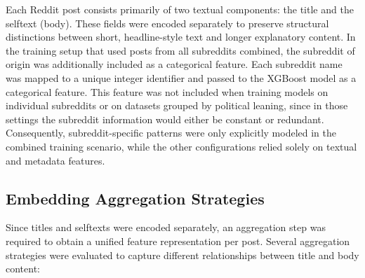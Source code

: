 Each Reddit post consists primarily of two textual components: the title and the selftext (body). 
These fields were encoded separately to preserve structural distinctions between short, headline-style text and longer explanatory content. 
In the training setup that used posts from all subreddits combined, the subreddit of origin was additionally included as a categorical feature. 
Each subreddit name was mapped to a unique integer identifier and passed to the XGBoost model as a categorical feature. This feature was not included when training models on individual subreddits or on datasets grouped by political leaning, since in those settings the subreddit information would either be constant or redundant. 
Consequently, subreddit-specific patterns were only explicitly modeled in the combined training scenario, while the other configurations relied solely on textual and metadata features.

\subsection{Embedding Aggregation Strategies}

Since titles and selftexts were encoded separately, an aggregation step was required to obtain a unified feature representation per post. Several aggregation strategies were evaluated to capture different relationships between title and body content:

